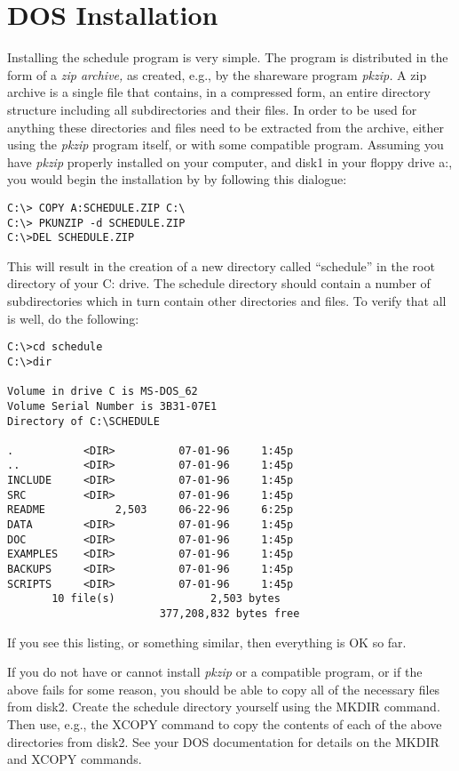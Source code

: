 \section{DOS Installation}
Installing the schedule program is very simple. The program is distributed
in the form of a {\it zip archive,} as created, e.g., by the shareware
program {\it pkzip.} A zip archive is a single file that contains, in
a compressed form, an entire directory structure including all subdirectories
and their files. In order to be used for anything these directories and
files need to be extracted from the archive, either using the {\it pkzip}
program itself, or with some compatible program. Assuming you have
{\it pkzip} properly installed on your computer, and  disk1
in your floppy drive a:, you would begin the
installation by by following this dialogue: \smallskip
\begin{verbatim}C:\> COPY A:SCHEDULE.ZIP C:\
C:\> PKUNZIP -d SCHEDULE.ZIP
C:\>DEL SCHEDULE.ZIP
\end{verbatim}
\smallskip
This will result in the creation of a new directory called ``schedule''
in the root directory of your C: drive. The schedule directory should
contain a number of subdirectories which in turn contain other directories
and files. To verify that all is well, do the following: \smallskip
\begin{verbatim}
C:\>cd schedule
C:\>dir

Volume in drive C is MS-DOS_62
Volume Serial Number is 3B31-07E1
Directory of C:\SCHEDULE

.           <DIR>          07-01-96     1:45p
..          <DIR>          07-01-96     1:45p
INCLUDE     <DIR>          07-01-96     1:45p
SRC         <DIR>          07-01-96     1:45p
README           2,503     06-22-96     6:25p
DATA        <DIR>          07-01-96     1:45p
DOC         <DIR>          07-01-96     1:45p
EXAMPLES    <DIR>          07-01-96     1:45p
BACKUPS     <DIR>          07-01-96     1:45p
SCRIPTS     <DIR>          07-01-96     1:45p
       10 file(s)               2,503 bytes
                        377,208,832 bytes free
\end{verbatim}
\smallskip 
If you see this listing, or something similar, then everything is OK so far.

If you do not have or cannot install {\it pkzip} or a compatible program, or if the above fails for some reason, you should be able to copy all of the
necessary files from disk2. Create the schedule 
directory yourself using the MKDIR command. Then use, e.g., the XCOPY
command to copy the contents of each of the above directories from 
disk2. See your DOS documentation for details on the MKDIR
and XCOPY commands.

